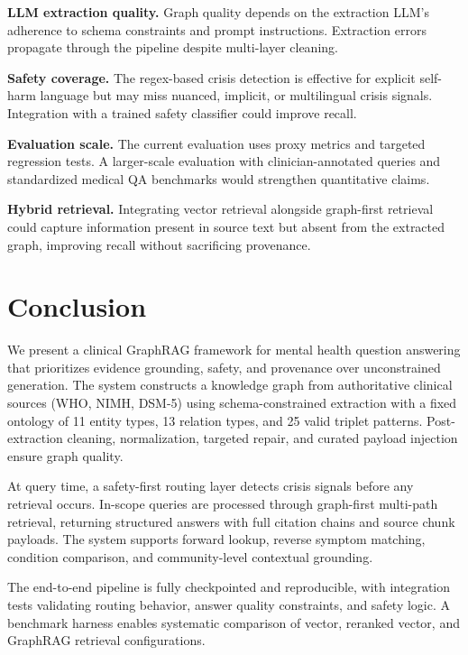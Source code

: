\documentclass[12pt,a4paper]{article}
\begin{document}
\textbf{LLM extraction quality.} Graph quality depends on the extraction LLM's adherence to schema constraints and prompt instructions. Extraction errors propagate through the pipeline despite multi-layer cleaning.

\textbf{Safety coverage.} The regex-based crisis detection is effective for explicit self-harm language but may miss nuanced, implicit, or multilingual crisis signals. Integration with a trained safety classifier could improve recall.

\textbf{Evaluation scale.} The current evaluation uses proxy metrics and targeted regression tests. A larger-scale evaluation with clinician-annotated queries and standardized medical QA benchmarks would strengthen quantitative claims.

\textbf{Hybrid retrieval.} Integrating vector retrieval alongside graph-first retrieval could capture information present in source text but absent from the extracted graph, improving recall without sacrificing provenance.

\section{Conclusion}

We present a clinical GraphRAG framework for mental health question answering that prioritizes evidence grounding, safety, and provenance over unconstrained generation. The system constructs a knowledge graph from authoritative clinical sources (WHO, NIMH, DSM-5) using schema-constrained extraction with a fixed ontology of 11 entity types, 13 relation types, and 25 valid triplet patterns. Post-extraction cleaning, normalization, targeted repair, and curated payload injection ensure graph quality.

At query time, a safety-first routing layer detects crisis signals before any retrieval occurs. In-scope queries are processed through graph-first multi-path retrieval, returning structured answers with full citation chains and source chunk payloads. The system supports forward lookup, reverse symptom matching, condition comparison, and community-level contextual grounding.

The end-to-end pipeline is fully checkpointed and reproducible, with integration tests validating routing behavior, answer quality constraints, and safety logic. A benchmark harness enables systematic comparison of vector, reranked vector, and GraphRAG retrieval configurations.
\end{document}
